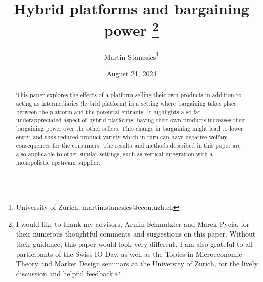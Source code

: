 \documentclass[a4paper]{article}
\title{%
    Hybrid platforms and bargaining power%
    \thanks{
        I would like to thank my advisors, Armin Schmutzler and Marek Pycia, for their numerous thoughtful comments and suggestions on this paper.
        Without their guidance, this paper would look very different.
        I am also grateful to all participants of the Swiss IO Day, as well as the Topics in Microeconomic Theory and Market Design seminars at the University of Zurich, for the lively discussion and helpful feedback.
    }
}
\author{Martin Stancsics\thanks{University of Zurich, martin.stancsics@econ.uzh.ch}}
\date{August 21, 2024 \\\vspace{0.4cm} \latestversion}
\begin{document}
\maketitle

\begin{abstract}
    This paper explores the effects of a platform selling their own products in addition to acting as intermediaries (hybrid platform) in a setting where bargaining takes place between the platform and the potential entrants.
    It highlights a so-far underappreciated aspect of hybrid platforms: having their own products increases their bargaining power over the other sellers.
    This change in bargaining might lead to lower entry, and thus reduced product variety which in turn can have negative welfare consequences for the consumers.
    The results and methods described in this paper are also applicable to other similar settings, such as vertical integration with a monopolistic upstream supplier.
\end{abstract}



\appendix

\printbibliography


\end{document}
